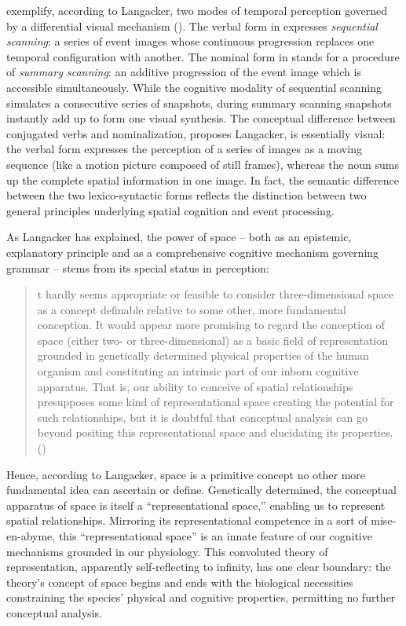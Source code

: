 \documentclass[english,output=paper,colorlinks,citecolor=brown]{../langscibook}
\begin{document}
exemplify, according to Langacker, two modes of temporal perception governed by a differential visual mechanism (\citeyear[146, example 19]{Langacker1987}). The verbal form in  expresses \textit{sequential scanning}: a series of event images whose continuous progression replaces one temporal configuration with another. The nominal form in  stands for a procedure of \textit{summary scanning}: an additive progression of the event image which is accessible simultaneously. While the cognitive modality of sequential scanning simulates a consecutive series of snapshots, during summary scanning snapshots instantly add up to form one visual synthesis. The conceptual difference between conjugated verbs and nominalization, proposes Langacker, is essentially visual: the verbal form expresses the perception of a series of images as a moving sequence (like a motion picture composed of still frames), whereas the noun sums up the complete spatial information in one image. In fact, the semantic difference between the two lexico-syntactic forms reflects the distinction between two general principles underlying spatial cognition and event processing.

As Langacker has explained, the power of space -- both as an epistemic, explanatory principle and as a comprehensive cognitive mechanism governing grammar -- stems from its special status in perception:

\begin{quote}\relax
[I]t hardly seems appropriate or feasible to consider three-dimensional space as a concept definable relative to some other, more fundamental conception. It would appear more promising to regard the conception of space (either two- or three-dimensional) as a basic field of representation grounded in genetically determined physical properties of the human organism and constituting an intrinsic part of our inborn cognitive apparatus. That is, our ability to conceive of spatial relationships presupposes some kind of representational space creating the potential for such relationships, but it is doubtful that conceptual analysis can go beyond positing this representational space and elucidating its properties. (\citealt[148]{Langacker1987})
\end{quote}

Hence, according to Langacker, space is a primitive concept no other more fundamental idea can ascertain or define. Genetically determined, the conceptual apparatus of space is itself a “representational space,” enabling us to represent spatial relationships. Mirroring its representational competence in a sort of mise-en-abyme, this “representational space” is an innate feature of our cognitive mechanisms grounded in our physiology. This convoluted theory of representation, apparently self-reflecting to infinity, has one clear boundary: the theory’s concept of space begins and ends with the biological necessities constraining the species’ physical and cognitive properties, permitting no further conceptual analysis. 
\end{document}
